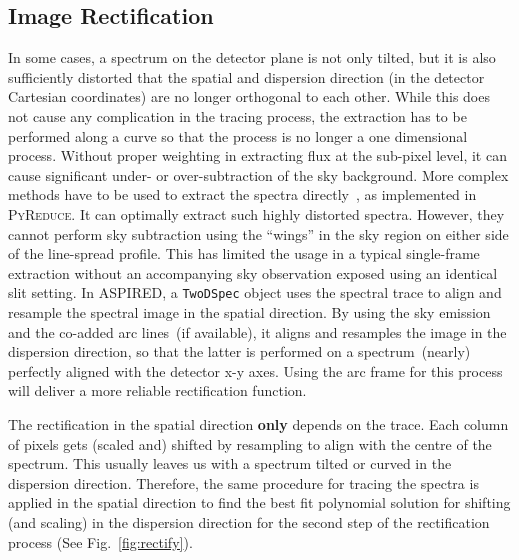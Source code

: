 \documentclass[linenumbers, twocolumn]{aastex631}
\begin{document}
\subsection{Image Rectification}
In some cases, a spectrum on the detector plane is not only tilted, but it is
also sufficiently distorted that the spatial and dispersion direction (in the
detector Cartesian coordinates) are no longer orthogonal to each other. While
this does not cause any complication in the tracing process, the extraction has
to be performed along a curve so that the process is no longer a one dimensional
process. Without proper weighting in extracting flux at the sub-pixel level,
it can cause significant under- or over-subtraction of the sky background. More
complex methods have to be used to extract the spectra
directly~\citep[e.g.][]{2021A&A...646A..32P}, as implemented in
\textsc{PyReduce}. It can optimally extract such highly distorted spectra.
However, they cannot perform sky subtraction using the ``wings'' in the sky
region on either side of the line-spread profile. This has limited the usage
in a typical single-frame extraction without an accompanying sky observation
exposed using an identical slit setting. In \textsc{ASPIRED}, a
\texttt{TwoDSpec} object uses the spectral trace to align and resample the
spectral image in the spatial direction. By using the sky emission and the
co-added arc lines~(if available), it aligns and resamples the image in the
dispersion direction, so that the latter is performed on a spectrum~(nearly)
perfectly aligned with the detector x-y axes. Using the arc frame for this
process will deliver a more reliable rectification function.

The rectification in the spatial direction \textbf{only} depends on the trace.
Each column of pixels gets (scaled and) shifted by resampling to align with the
centre of the spectrum. This usually leaves us with a spectrum tilted or curved
in the dispersion direction. Therefore, the same procedure for tracing the
spectra is applied in the spatial direction to find the best fit polynomial
solution for shifting (and scaling) in the dispersion direction for the second
step of the rectification process (See Fig.~\ref{fig:rectify}).
\end{document}

